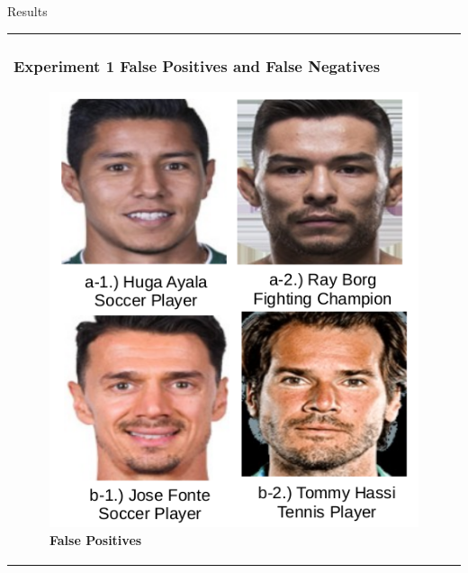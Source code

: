 \documentclass[11pt]{beamer}
\begin{document}
\begin{frame}{Results}
\begin{tabular}{l}
\parbox{1\linewidth}{
\frametitle{Experiment 1 False Positives and False Negatives}

\begin{figure}[H]
  \centering
  \begin{minipage}[b]{0.4\textwidth}
    \includegraphics[width=\textwidth]{figures/soccer_fp.png}
    \caption{\textbf{False Positives}}
    \label{fig:ex1fp}
  \end{minipage}
  \hfill
  \begin{minipage}[b]{0.4\textwidth}

\end{minipage}
\end{figure}}
\end{tabular}
\end{frame}
\end{document}
